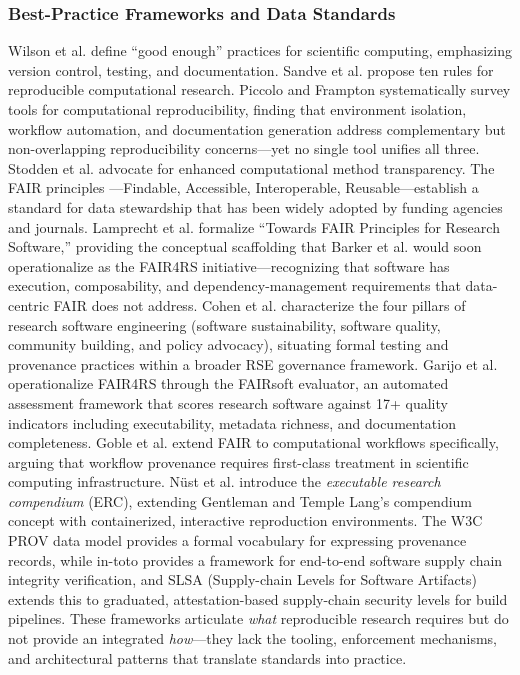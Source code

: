 \documentclass[
]{article}
\begin{document}
\subsubsection{Best-Practice Frameworks and Data
Standards}\label{best-practice-frameworks-and-data-standards}

Wilson et al. \citep{wilson2017good} define ``good enough'' practices
for scientific computing, emphasizing version control, testing, and
documentation. Sandve et al. \citep{sandve2013ten} propose ten rules for
reproducible computational research. Piccolo and Frampton
\citep{piccolo2016tools} systematically survey tools for computational
reproducibility, finding that environment isolation, workflow
automation, and documentation generation address complementary but
non-overlapping reproducibility concerns---yet no single tool unifies
all three. Stodden et al. \citep{stodden2016enhancing} advocate for
enhanced computational method transparency. The FAIR principles
\citep{wilkinson2016fair}---Findable, Accessible, Interoperable,
Reusable---establish a standard for data stewardship that has been
widely adopted by funding agencies and journals. Lamprecht et al.
\citep{lamprecht2020towards} formalize ``Towards FAIR Principles for
Research Software,'' providing the conceptual scaffolding that Barker et
al. \citep{barker2022fair4rs} would soon operationalize as the FAIR4RS
initiative---recognizing that software has execution, composability, and
dependency-management requirements that data-centric FAIR does not
address. Cohen et al. \citep{cohen2021four} characterize the four
pillars of research software engineering (software sustainability,
software quality, community building, and policy advocacy), situating
formal testing and provenance practices within a broader RSE governance
framework. Garijo et al. \citep{garijo2024fairsoft} operationalize
FAIR4RS through the FAIRsoft evaluator, an automated assessment
framework that scores research software against 17+ quality indicators
including executability, metadata richness, and documentation
completeness. Goble et al. \citep{goble2020fair} extend FAIR to
computational workflows specifically, arguing that workflow provenance
requires first-class treatment in scientific computing infrastructure.
Nüst et al. \citep{nust2017containerization} introduce the
\emph{executable research compendium} (ERC), extending Gentleman and
Temple Lang's compendium concept with containerized, interactive
reproduction environments. The W3C PROV data model
\citep{moreau2013provdm} provides a formal vocabulary for expressing
provenance records, while in-toto \citep{torresarias2019intoto} provides
a framework for end-to-end software supply chain integrity verification,
and SLSA \citep{openssf2023slsa} (Supply-chain Levels for Software
Artifacts) extends this to graduated, attestation-based supply-chain
security levels for build pipelines. These frameworks articulate
\emph{what} reproducible research requires but do not provide an
integrated \emph{how}---they lack the tooling, enforcement mechanisms,
and architectural patterns that translate standards into practice.
\end{document}
